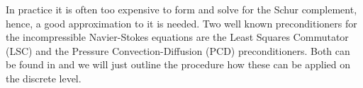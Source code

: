 In practice it is often too expensive to form and solve for the Schur complement, hence, a good approximation to it is needed. Two well known preconditioners for the incompressible Navier-Stokes equations are the Least Squares Commutator (LSC) and the Pressure Convection-Diffusion (PCD) preconditioners. Both can be found in \cite{elman2005finite} and we will just outline the procedure how these can be applied on the discrete level.




